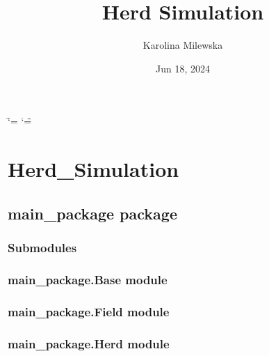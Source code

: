 \documentclass[letterpaper,10pt,english]{sphinxmanual}
\title{Herd Simulation}
\date{Jun 18, 2024}
\author{Karolina Milewska}
\begin{document}
\ifdefined\shorthandoff
  \ifnum\catcode`\=\string=\active\shorthandoff{=}\fi
  \ifnum\catcode`\"=\active{}\fi
\fi

\pagestyle{empty}
\sphinxmaketitle
\pagestyle{plain}
\sphinxtableofcontents
\pagestyle{normal}
\label{\detokenize{index::doc}}


\sphinxstepscope


\chapter{Herd\_Simulation}
\label{\detokenize{modules:herd-simulation}}\label{\detokenize{modules::doc}}
\sphinxstepscope


\section{main\_package package}
\label{\detokenize{main_package:main-package-package}}\label{\detokenize{main_package::doc}}

\subsection{Submodules}
\label{\detokenize{main_package:submodules}}

\subsection{main\_package.Base module}
\label{\detokenize{main_package:main-package-base-module}}

\subsection{main\_package.Field module}
\label{\detokenize{main_package:main-package-field-module}}

\subsection{main\_package.Herd module}
\label{\detokenize{main_package:module-main_package.Herd}}\label{\detokenize{main_package:main-package-herd-module}}
\end{document}
